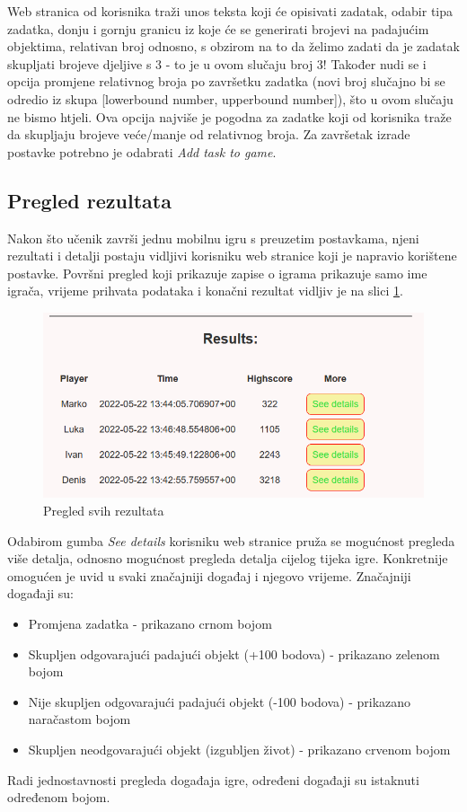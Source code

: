 \documentclass[times, utf8, zavrsni, numeric]{fer}
\begin{document}
		Web stranica od korisnika traži unos teksta koji će opisivati zadatak, odabir tipa zadatka, donju i gornju granicu iz koje će se generirati brojevi na padajućim objektima, relativan broj odnosno, s obzirom na to da želimo zadati da je zadatak
		skupljati brojeve djeljive s 3 - to je u ovom slučaju broj 3! Također nudi se i opcija promjene relativnog broja po završetku zadatka (novi broj slučajno bi se odredio iz skupa [lowerbound number, upperbound number]), što u ovom slučaju ne bismo
		htjeli. Ova opcija najviše je pogodna za zadatke koji od korisnika traže da skupljaju brojeve veće/manje od relativnog broja. Za završetak izrade postavke potrebno je odabrati \textit{Add task to game}.
	
	\subsection{Pregled rezultata}
	Nakon što učenik završi jednu mobilnu igru s preuzetim postavkama, njeni rezultati i detalji postaju vidljivi korisniku web stranice koji je napravio korištene postavke. 
	Površni pregled koji prikazuje zapise o igrama prikazuje samo ime igrača, vrijeme prihvata podataka i konačni rezultat vidljiv je na slici \ref{fig:pregledsvihrezultata}.
	\begin{figure}[H]
		\includegraphics[scale = 0.9]{"slike/pregledsvihrezultata.png"} 
		\centering
		\caption{Pregled svih rezultata}
		\label{fig:pregledsvihrezultata}
	\end{figure}
	
	Odabirom gumba \textit{See details} korisniku web stranice pruža se mogućnost pregleda više detalja, odnosno mogućnost pregleda detalja cijelog tijeka igre. Konkretnije omogućen je uvid u svaki značajniji događaj i njegovo vrijeme.
	Značajniji događaji su:
		\begin{itemize}
				\item  {Promjena zadatka - prikazano crnom bojom}
				\item  {Skupljen odgovarajući padajući objekt (+100 bodova) - prikazano zelenom bojom}
				\item  {Nije skupljen odgovarajući padajući objekt (-100 bodova) - prikazano naračastom bojom}
				\item  {Skupljen neodgovarajući objekt (izgubljen život) - prikazano crvenom bojom}
		\end{itemize}
	Radi jednostavnosti pregleda događaja igre, određeni događaji su istaknuti određenom bojom.
	
\end{document}
